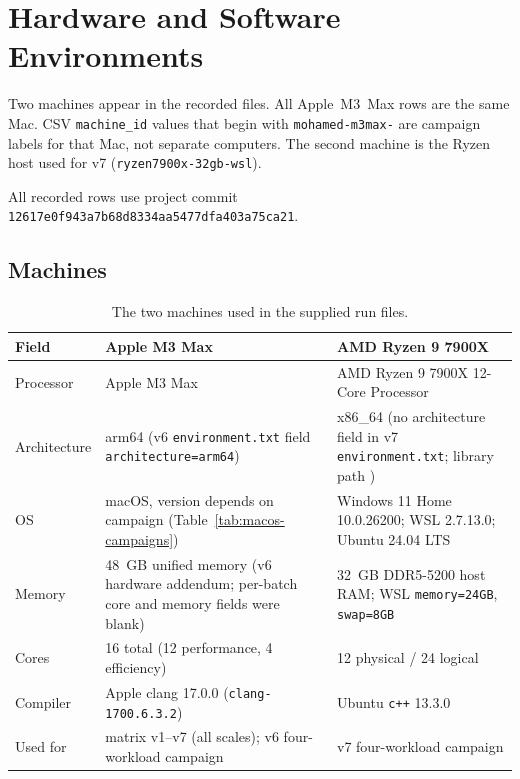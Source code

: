 \section{Hardware and Software Environments}
\label{sec:environments}

Two machines appear in the recorded files.
All Apple~M3~Max rows are the same Mac.
CSV \texttt{machine\_id} values that begin with \texttt{mohamed-m3max-} are campaign labels for that Mac, not separate computers.
The second machine is the Ryzen host used for v7 (\texttt{ryzen7900x-32gb-wsl}).

All recorded rows use project commit \texttt{12617e0f943a7b68d8334aa5477dfa403a75ca21}.

\subsection{Machines}

\begin{table}[H]
\centering
\caption{The two machines used in the supplied run files.}
\label{tab:machines}
\footnotesize
\begin{tabularx}{\textwidth}{@{}l L L@{}}
\toprule
Field & Apple M3 Max & AMD Ryzen 9 7900X \\
\midrule
Processor & Apple M3 Max & AMD Ryzen 9 7900X 12-Core Processor \\
Architecture & arm64 (v6 \texttt{environment.txt} field \texttt{architecture=arm64}) & x86\_64 (no architecture field in v7 \texttt{environment.txt}; library path ) \\
OS & macOS, version depends on campaign (Table~\ref{tab:macos-campaigns}) & Windows 11 Home 10.0.26200; WSL 2.7.13.0; Ubuntu 24.04 LTS \\
Memory & 48~GB unified memory (v6 hardware addendum; per-batch core and memory fields were blank) & 32~GB DDR5-5200 host RAM; WSL \texttt{memory=24GB}, \texttt{swap=8GB} \\
Cores & 16 total (12 performance, 4 efficiency) & 12 physical / 24 logical \\
Compiler & Apple clang 17.0.0 (\texttt{clang-1700.6.3.2}) & Ubuntu \texttt{c++} 13.3.0 \\
Used for & matrix v1--v7 (all scales); v6 four-workload campaign & v7 four-workload campaign \\
\bottomrule
\end{tabularx}
\end{table}

